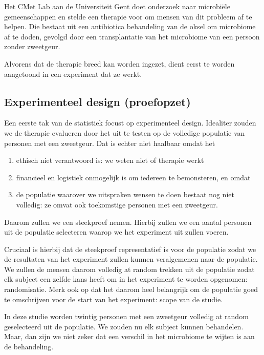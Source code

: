 \documentclass[
  12pt,dutch,coursenotes]{book}
\providecommand{\tightlist}{%
  \setlength{\itemsep}{0pt}\setlength{\parskip}{0pt}}
\theoremstyle{definition}
\theoremstyle{definition}
\theoremstyle{definition}
\theoremstyle{remark}
\begin{document}
Het CMet Lab aan de Universiteit Gent doet onderzoek naar microbiële gemeenschappen en stelde een therapie voor om mensen van dit probleem af te helpen.
Die bestaat uit een antibiotica behandeling van de oksel om microbiome af te doden,
gevolgd door een transplantatie van het microbiome van een persoon zonder zweetgeur.

Alvorens dat de therapie breed kan worden ingezet, dient eerst te worden aangetoond in een experiment dat ze werkt.

\hypertarget{experimenteel-design-proefopzet}{%
\subsection{Experimenteel design (proefopzet)}\label{experimenteel-design-proefopzet}}

Een eerste tak van de statistiek focust op experimenteel design.
Idealiter zouden we de therapie evalueren door het uit te testen op de volledige populatie van personen met een zweetgeur.
Dat is echter niet haalbaar omdat het

\begin{enumerate}
\def\labelenumi{\arabic{enumi}.}
\tightlist
\item
  ethisch niet verantwoord is: we weten niet of therapie werkt
\item
  financieel en logistiek onmogelijk is om iedereen te bemonsteren, en omdat
\item
  de populatie waarover we uitspraken wensen te doen bestaat nog niet volledig: ze omvat ook toekomstige personen met een zweetgeur.
\end{enumerate}

Daarom zullen we een steekproef nemen.
Hierbij zullen we een aantal personen uit de populatie selecteren waarop we het experiment uit zullen voeren.

Cruciaal is hierbij dat de steekproef representatief is voor de populatie zodat we de resultaten van het experiment zullen kunnen veralgemenen naar de populatie. We zullen de mensen daarom volledig at random trekken uit de populatie zodat elk subject een zelfde kans heeft om in het experiment te worden opgenomen: randomisatie.
Merk ook op dat het daarom heel belangrijk om de populatie goed te omschrijven voor de start van het experiment: scope van de studie.

In deze studie worden twintig personen met een zweetgeur volledig at random geselecteerd uit de populatie.
We zouden nu elk subject kunnen behandelen.
Maar, dan zijn we niet zeker dat een verschil in het microbiome te wijten is aan de behandeling.
\end{document}
